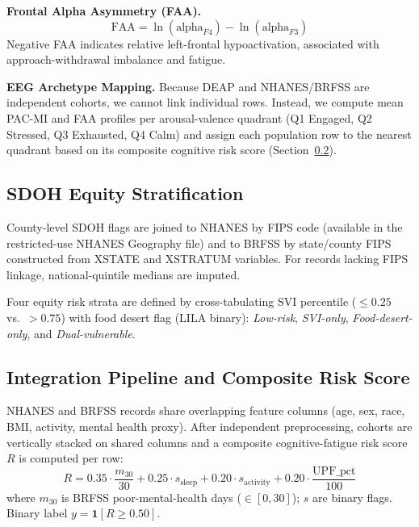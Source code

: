 \documentclass[journal]{IEEEtran}
\begin{document}
\textbf{Frontal Alpha Asymmetry (FAA).}
\begin{equation}
\text{FAA} = \ln(\text{alpha}_{F4}) - \ln(\text{alpha}_{F3})
\label{eq:faa}
\end{equation}
Negative FAA indicates relative left-frontal hypoactivation, associated with
approach-withdrawal imbalance and fatigue.

\textbf{EEG Archetype Mapping.} Because DEAP and NHANES/BRFSS are independent
cohorts, we cannot link individual rows. Instead, we compute mean PAC-MI and
FAA profiles per arousal-valence quadrant (Q1 Engaged, Q2 Stressed, Q3
Exhausted, Q4 Calm) and assign each population row to the nearest quadrant
based on its composite cognitive risk score (Section~\ref{sec:integration}).

\subsection{SDOH Equity Stratification}

County-level SDOH flags are joined to NHANES by FIPS code (available in the
restricted-use NHANES Geography file) and to BRFSS by state/county FIPS
constructed from XSTATE and XSTRATUM variables. For records lacking FIPS
linkage, national-quintile medians are imputed.

Four equity risk strata are defined by cross-tabulating SVI percentile
($\leq 0.25$ vs.\ $> 0.75$) with food desert flag (LILA binary):
\textit{Low-risk}, \textit{SVI-only}, \textit{Food-desert-only}, and
\textit{Dual-vulnerable}.

\subsection{Integration Pipeline and Composite Risk Score}
\label{sec:integration}

NHANES and BRFSS records share overlapping feature columns (age, sex, race,
BMI, activity, mental health proxy). After independent preprocessing, cohorts
are vertically stacked on shared columns and a composite cognitive-fatigue
risk score $R$ is computed per row:
\begin{equation}
R = 0.35 \cdot \frac{m_{30}}{30}
  + 0.25 \cdot s_{\text{sleep}}
  + 0.20 \cdot s_{\text{activity}}
  + 0.20 \cdot \frac{\text{UPF}\_\text{pct}}{100}
\label{eq:risk_score}
\end{equation}
where $m_{30}$ is BRFSS poor-mental-health days ($\in [0,30]$); $s$ are binary
flags. Binary label $y = \mathbf{1}[R \geq 0.50]$.
\end{document}
